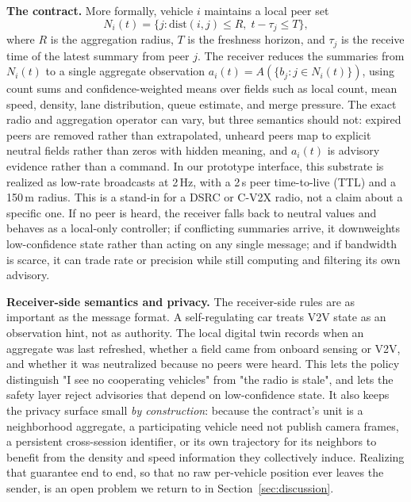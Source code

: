 \noindent\textbf{The contract.}
More formally, vehicle \(i\) maintains a local peer set
\[
N_i(t)=\{j: \mathrm{dist}(i,j) \le R,\; t-\tau_j \le T\},
\]
where \(R\) is the aggregation radius, \(T\) is the freshness horizon, and \(\tau_j\) is the receive time of the latest summary from peer \(j\). The receiver reduces the summaries from \(N_i(t)\) to a single aggregate observation \(a_i(t)=A(\{b_j:j\in N_i(t)\})\), using count sums and confidence-weighted means over fields such as local count, mean speed, density, lane distribution, queue estimate, and merge pressure. The exact radio and aggregation operator can vary, but three semantics should not: expired peers are removed rather than extrapolated, unheard peers map to explicit neutral fields rather than zeros with hidden meaning, and \(a_i(t)\) is advisory evidence rather than a command. In our prototype interface, this substrate is realized as low-rate broadcasts at 2\,Hz, with a 2\,s peer time-to-live (TTL) and a 150\,m radius. This is a stand-in for a DSRC or C-V2X radio, not a claim about a specific one. If no peer is heard, the receiver falls back to neutral values and behaves as a local-only controller; if conflicting summaries arrive, it downweights low-confidence state rather than acting on any single message; and if bandwidth is scarce, it can trade rate or precision while still computing and filtering its own advisory.

\noindent\textbf{Receiver-side semantics and privacy.}
The receiver-side rules are as important as the message format. A self-regulating car treats V2V state as an observation hint, not as authority. The local digital twin records when an aggregate was last refreshed, whether a field came from onboard sensing or V2V, and whether it was neutralized because no peers were heard. This lets the policy distinguish "I see no cooperating vehicles" from "the radio is stale", and lets the safety layer reject advisories that depend on low-confidence state. It also keeps the privacy surface small \emph{by construction}: because the contract's unit is a neighborhood aggregate, a participating vehicle need not publish camera frames, a persistent cross-session identifier, or its own trajectory for its neighbors to benefit from the density and speed information they collectively induce. Realizing that guarantee end to end, so that no raw per-vehicle position ever leaves the sender, is an open problem we return to in Section~\ref{sec:discussion}.

